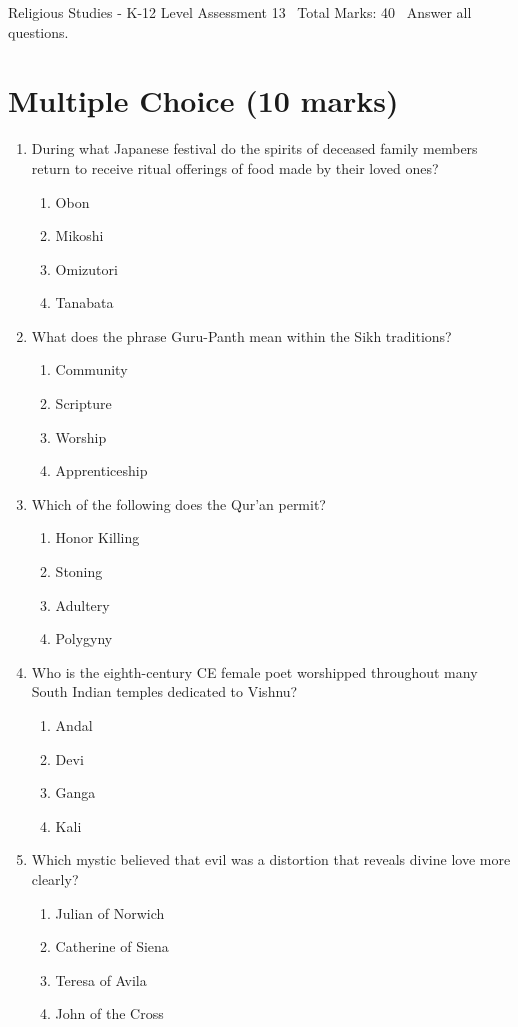 \documentclass[12pt]{article}
\begin{document}
\begin{center}
Religious Studies - K-12 Level Assessment 13 \
Total Marks: 40 \
Answer all questions.
\end{center}

\section*{Multiple Choice (10 marks)}
\begin{enumerate}[label=\arabic*.]
\item During what Japanese festival do the spirits of deceased family members return to receive ritual offerings of food made by their loved ones?
\begin{enumerate}[label=(\alph*)]
    \item Obon
    \item Mikoshi
    \item Omizutori
    \item Tanabata
\end{enumerate}
\item What does the phrase Guru-Panth mean within the Sikh traditions?
\begin{enumerate}[label=(\alph*)]
    \item Community
    \item Scripture
    \item Worship
    \item Apprenticeship
\end{enumerate}
\item Which of the following does the Qur'an permit?
\begin{enumerate}[label=(\alph*)]
    \item Honor Killing
    \item Stoning
    \item Adultery
    \item Polygyny
\end{enumerate}
\item Who is the eighth-century CE female poet worshipped throughout many South Indian temples dedicated to Vishnu?
\begin{enumerate}[label=(\alph*)]
    \item Andal
    \item Devi
    \item Ganga
    \item Kali
\end{enumerate}
\item Which mystic believed that evil was a distortion that reveals divine love more clearly?
\begin{enumerate}[label=(\alph*)]
    \item Julian of Norwich
    \item Catherine of Siena
    \item Teresa of Avila
    \item John of the Cross
\end{enumerate}
\end{enumerate}
\end{document}
